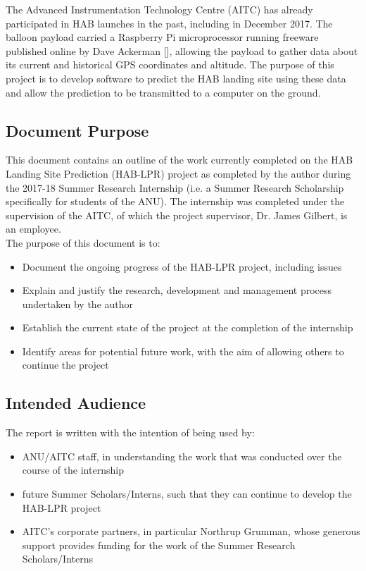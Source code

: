 \documentclass[11pt]{article}
\begin{document}
The Advanced Instrumentation Technology Centre (AITC) has already participated in HAB launches in the past, including in December 2017. The balloon payload carried a Raspberry Pi microprocessor running freeware published online by Dave Ackerman [], allowing the payload to gather data about its current and historical GPS coordinates and altitude. The purpose of this project is to develop software to predict the HAB landing site using these data and allow the prediction to be transmitted to a computer on the ground.

\subsection{Document Purpose}

This document contains an outline of the work currently completed on the HAB Landing Site Prediction (HAB-LPR) project as completed by the author during the 2017-18 Summer Research Internship (i.e. a Summer Research Scholarship specifically for students of the ANU). The internship was completed under the supervision of the AITC, of which the project supervisor, Dr. James Gilbert, is an employee. \\

The purpose of this document is to:
\begin{itemize}
\item Document the ongoing progress of the HAB-LPR project, including issues
\item Explain and justify the research, development and management process undertaken by the author
\item Establish the current state of the project at the completion of the internship
\item Identify areas for potential future work, with the aim of allowing others to continue the project
\end{itemize}


\subsection{Intended Audience}
The report is written with the intention of being used by: 
\begin{itemize}
\item ANU/AITC staff, in understanding the work that was conducted over the course of the internship
\item future Summer Scholars/Interns, such that they can continue to develop the HAB-LPR project
\item AITC's corporate partners, in particular Northrup Grumman, whose generous support provides funding for the work of the Summer Research Scholars/Interns
\end{itemize}
\end{document}
